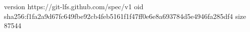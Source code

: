 version https://git-lfs.github.com/spec/v1
oid sha256:f1fa2a9d67fc649fbe92cb4feb5161f1f47ff0e6e8a693784d5e4946fa285df4
size 87544
